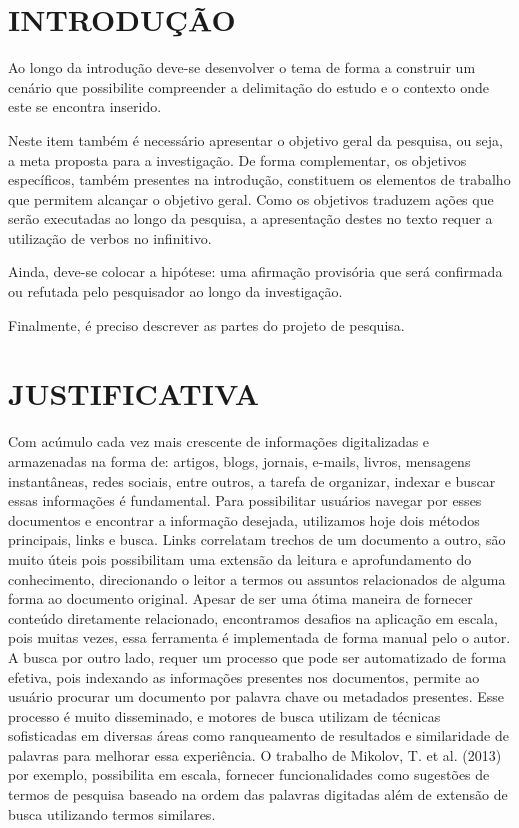 \documentclass[12pt,a4paper]{article}
\begin{document}
  \newpage
  \pagestyle{plain}
  \renewcommand{\baselinestretch}{1.5}
  \normalsize
  \section{INTRODUÇÃO}
  Ao longo da introdução deve-se desenvolver o tema de forma a construir um cenário que possibilite compreender a delimitação do estudo e o contexto onde este se encontra inserido.
  
  Neste item também é necessário apresentar o objetivo geral da pesquisa, ou seja, a meta proposta para a investigação. De forma complementar, os objetivos específicos, também presentes na introdução, constituem os elementos de trabalho que permitem alcançar o objetivo geral. Como os objetivos traduzem ações que serão executadas ao longo da pesquisa, a apresentação destes no texto requer a utilização de verbos no infinitivo.
  
  Ainda, deve-se colocar a hipótese: uma afirmação provisória que será confirmada ou refutada pelo pesquisador ao longo da investigação.
  
  Finalmente, é preciso descrever as partes do projeto de pesquisa.
  
  \section{JUSTIFICATIVA}
  Com acúmulo cada vez mais crescente de informações digitalizadas e armazenadas na forma de: artigos, blogs, jornais, e-mails, livros, mensagens instantâneas, redes sociais, entre outros, a tarefa de organizar, indexar e buscar essas informações é fundamental. Para possibilitar usuários navegar por esses documentos e encontrar a informação desejada, utilizamos hoje dois métodos principais, links e busca. Links correlatam trechos de um documento a outro, são muito úteis pois possibilitam uma extensão da leitura e aprofundamento do conhecimento, direcionando o leitor a termos ou assuntos relacionados de alguma forma ao documento original. Apesar de ser uma ótima maneira de fornecer conteúdo diretamente relacionado, encontramos desafios na aplicação em escala, pois muitas vezes, essa ferramenta  é implementada de forma manual pelo o autor. A busca por outro lado, requer um processo que pode ser automatizado de forma efetiva, pois indexando as informações presentes nos documentos, permite ao usuário procurar um documento por palavra chave ou metadados presentes. Esse processo é muito disseminado, e motores de busca utilizam de técnicas sofisticadas em diversas áreas como ranqueamento de resultados e similaridade de palavras para melhorar essa experiência. O trabalho de Mikolov, T. et al. (2013) por exemplo, possibilita em escala, fornecer funcionalidades como sugestões de termos de pesquisa baseado na ordem das palavras digitadas além de extensão de busca utilizando termos similares.
  
\end{document}
